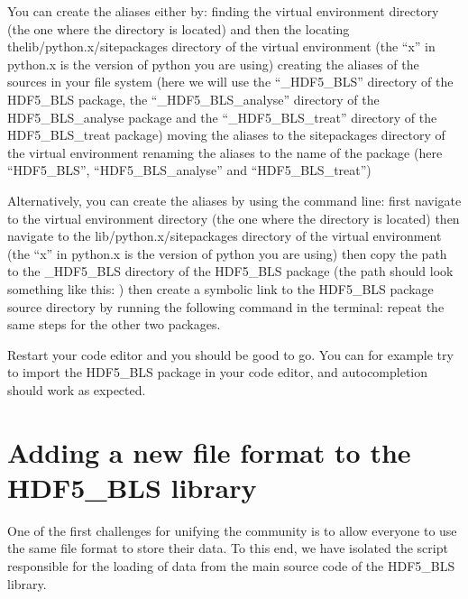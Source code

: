 \documentclass[letterpaper,10pt,english]{sphinxmanual}
\begin{document}
\sphinxAtStartPar
You can create the aliases either by:
\sphinxhyphen{} finding the virtual environment directory (the one where the  directory is located) and then the
\sphinxhyphen{} locating thelib/python.x/site\sphinxhyphen{}packages directory of the virtual environment (the “x” in python.x is the version of python you are using)
\sphinxhyphen{} creating the aliases of the sources in your file system (here we will use the “\_HDF5\_BLS” directory of the HDF5\_BLS package, the “\_HDF5\_BLS\_analyse” directory of the HDF5\_BLS\_analyse package and the “\_HDF5\_BLS\_treat” directory of the HDF5\_BLS\_treat package)
\sphinxhyphen{} moving the aliases to the site\sphinxhyphen{}packages directory of the virtual environment
\sphinxhyphen{} renaming the aliases to the name of the package (here “HDF5\_BLS”, “HDF5\_BLS\_analyse” and “HDF5\_BLS\_treat”)

\sphinxAtStartPar
Alternatively, you can create the aliases by using the command line:
\sphinxhyphen{} first navigate to the virtual environment directory (the one where the  directory is located)
\sphinxhyphen{} then navigate to the lib/python.x/site\sphinxhyphen{}packages directory of the virtual environment (the “x” in python.x is the version of python you are using)
\sphinxhyphen{} then copy the path to the \_HDF5\_BLS directory of the HDF5\_BLS package (the path should look something like this: )
\sphinxhyphen{} then create a symbolic link to the HDF5\_BLS package source directory by running the following command in the terminal: 
\sphinxhyphen{} repeat the same steps for the other two packages.

\sphinxAtStartPar
Restart your code editor and you should be good to go. You can for example try to import the HDF5\_BLS package in your code editor, and autocompletion should work as expected.

\sphinxstepscope


\chapter{Adding a new file format to the HDF5\_BLS library}
\label{\detokenize{source/developer/add_file_format:adding-a-new-file-format-to-the-hdf5-bls-library}}\label{\detokenize{source/developer/add_file_format::doc}}
\sphinxAtStartPar
One of the first challenges for unifying the community is to allow everyone to use the same file format to store their data. To this end, we have isolated the script responsible for the loading of data from the main source code of the HDF5\_BLS library.
\end{document}
